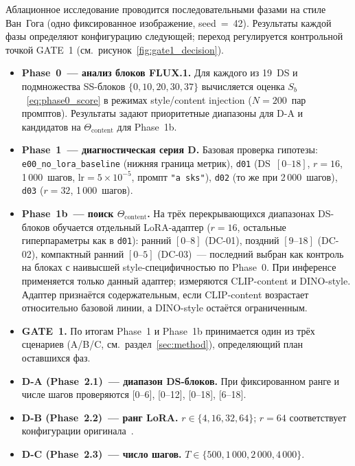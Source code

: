 Аблационное исследование проводится последовательными фазами на стиле Ван~Гога (одно фиксированное изображение, seed~=~42). Результаты каждой фазы определяют конфигурацию следующей; переход регулируется контрольной точкой GATE~1 (см.~рисунок~\ref{fig:gate1_decision}).

\begin{itemize}\itemsep0.2em
    \item \textbf{Phase~0~--- анализ блоков FLUX.1.} Для каждого из 19~DS и подмножества SS-блоков $\{0, 10, 20, 30, 37\}$ вычисляется оценка $S_b$~\eqref{eq:phase0_score} в режимах style/content injection ($N=200$~пар промптов). Результаты задают приоритетные диапазоны для D-A и кандидатов на $\Theta_\text{content}$ для Phase~1b.

    \item \textbf{Phase~1~--- диагностическая серия D.} Базовая проверка гипотезы: \texttt{e00\_no\_lora\_baseline} (нижняя граница метрик), \texttt{d01} (DS~$[0\text{--}18]$, $r{=}16$, 1\,000~шагов, $\text{lr}{=}5{\times}10^{-5}$, промпт \texttt{"a sks"}), \texttt{d02} (то же при 2\,000~шагов), \texttt{d03} ($r{=}32$, 1\,000~шагов).

    \item \textbf{Phase~1b~--- поиск $\Theta_\text{content}$.} На трёх перекрывающихся диапазонах DS-блоков обучается отдельный LoRA-адаптер ($r{=}16$, остальные гиперпараметры как в \texttt{d01}): ранний $[0\text{--}8]$ (DC-01), поздний $[9\text{--}18]$ (DC-02), компактный ранний $[0\text{--}5]$ (DC-03)~--- последний выбран как контроль на блоках с наивысшей style-специфичностью по Phase~0. При инференсе применяется только данный адаптер; измеряются CLIP-content и DINO-style. Адаптер признаётся содержательным, если CLIP-content возрастает относительно базовой линии, а DINO-style остаётся ограниченным.

    \item \textbf{GATE~1.} По итогам Phase~1 и Phase~1b принимается один из трёх сценариев (A/B/C, см.~раздел~\ref{sec:method}), определяющий план оставшихся фаз.

    \item \textbf{D-A (Phase~2.1)~--- диапазон DS-блоков.} При фиксированном ранге и числе шагов проверяются [0--6], [0--12], [0--18], [6--18].

    \item \textbf{D-B (Phase~2.2)~--- ранг LoRA.} $r \in \{4, 16, 32, 64\}$; $r{=}64$ соответствует конфигурации оригинала~\cite{frenkel2024blora}.

    \item \textbf{D-C (Phase~2.3)~--- число шагов.} $T \in \{500, 1\,000, 2\,000, 4\,000\}$.


\end{itemize}
